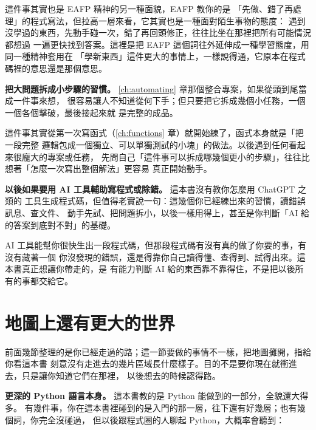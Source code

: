 這件事其實也是 EAFP 精神的另一種面貌，EAFP 教你的是
「先做、錯了再處理」的程式寫法，但拉高一層來看，它其實也是一種面對陌生事物的態度：
遇到沒學過的東西，先動手碰一次，錯了再回頭修正，往往比坐在那裡把所有可能情況都想過
一遍更快找到答案。這裡是把 EAFP 這個詞往外延伸成一種學習態度，用同一種精神套用在
「學新東西」這件更大的事情上，一樣說得通，它原本在程式碼裡的意思還是那個意思。

\textbf{把大問題拆成小步驟的習慣。} \ref{ch:automating} 章那個整合專案，如果從頭到尾當成一件事來想，
很容易讓人不知道從何下手；但只要把它拆成幾個小任務，一個一個各個擊破，最後接起來就
是完整的成品。

這件事其實從第一次寫函式（\ref{ch:functions} 章）就開始練了，函式本身就是「把一段完整
邏輯包成一個獨立、可以單獨測試的小塊」的做法。以後遇到任何看起來很龐大的專案或任務，
先問自己「這件事可以拆成哪幾個更小的步驟」，往往比想著「怎麼一次寫出整個解法」更容易
真正開始動手。

\textbf{以後如果要用 AI 工具輔助寫程式或除錯。} 這本書沒有教你怎麼用 ChatGPT 之類的
工具生成程式碼，但值得老實說一句：這幾個你已經練出來的習慣，讀錯誤訊息、查文件、
動手先試、把問題拆小，以後一樣用得上，甚至是你判斷「AI 給的答案到底對不對」的基礎。

AI 工具能幫你很快生出一段程式碼，但那段程式碼有沒有真的做了你要的事，有沒有藏著一個
你沒發現的錯誤，還是得靠你自己讀得懂、查得到、試得出來。這本書真正想讓你帶走的，是
有能力判斷 AI 給的東西靠不靠得住，不是把以後所有的事都交給它。

\section{地圖上還有更大的世界}
\label{sec:beyond-this-book}

前面幾節整理的是你已經走過的路；這一節要做的事情不一樣，把地圖攤開，指給你看這本書
刻意沒有走進去的幾片區域長什麼樣子。目的不是要你現在就衝進去，只是讓你知道它們在那裡，
以後想去的時候認得路。

\textbf{更深的 Python 語言本身。} 這本書教的是 Python 能做到的一部分，全貌還大得多。
有幾件事，你在這本書裡碰到的是入門的那一層，往下還有好幾層；也有幾個詞，你完全沒碰過，
但以後跟程式圈的人聊起 Python，大概率會聽到：


